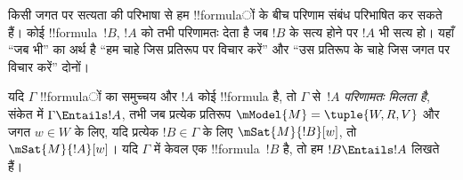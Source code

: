 \documentclass[../../../include/open-logic-section]{subfiles}
\begin{document}


\begin{explain}
  किसी जगत पर सत्यता की परिभाषा से हम !!{formula}ों के बीच परिणाम संबंध
  परिभाषित कर सकते हैं। कोई !!{formula}~$!B$, $!A$ को तभी परिणामतः देता है
  जब $!B$ के सत्य होने पर $!A$ भी सत्य हो। यहाँ ``जब भी'' का अर्थ है
  ``हम चाहे जिस प्रतिरूप पर विचार करें'' और ``उस प्रतिरूप के चाहे जिस जगत
  पर विचार करें'' दोनों।
\end{explain}

\begin{defn}
  यदि $\Gamma$ !!{formula}ों का समुच्चय और $!A$ कोई !!{formula} है, तो
  $\Gamma$ से~$!A$ \emph{परिणामतः मिलता है}, संकेत में
  $\Gamma \Entails !A$, तभी जब प्रत्येक प्रतिरूप
  $\mModel{M} = \tuple{W, R, V}$ और जगत $w \in W$ के लिए, यदि प्रत्येक
  $!B \in \Gamma$ के लिए $\mSat{M}{!B}[w]$, तो $\mSat{M}{!A}[w]$। यदि
  $\Gamma$ में केवल एक !!{formula}~$!B$ है, तो हम $!B \Entails !A$ लिखते हैं।
\end{defn}
\end{document}
